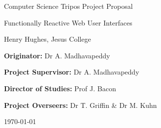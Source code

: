 \documentclass[10pt,a4paper]{article}
\begin{document}
  \begin{titlepage}
    \vfil
    \centerline{\Large Computer Science Tripos Project Proposal}
    \vspace{0.4in}
    \centerline{\Huge Functionally Reactive Web User Interfaces }
    \vspace{0.4in}
    \centerline{\large Henry Hughes, Jesus College}
    \vspace{0.3in}
    \vfill
    \centerline{{\bf Originator:} Dr A. Madhavapeddy}
    \vspace{0.1in}
    \centerline{{\bf Project Supervisor:} Dr A. Madhavapeddy}
    \vspace{0.1in}
    \centerline{{\bf Director of Studies:} Prof J. Bacon}
    \vspace{0.1in}
    \centerline{{\bf Project Overseers:} Dr T. Griffin \& Dr M. Kuhn}
    \vspace{0.3in}
    \centerline{\large \today}
    \vfil
  \end{titlepage}

\end{document}
